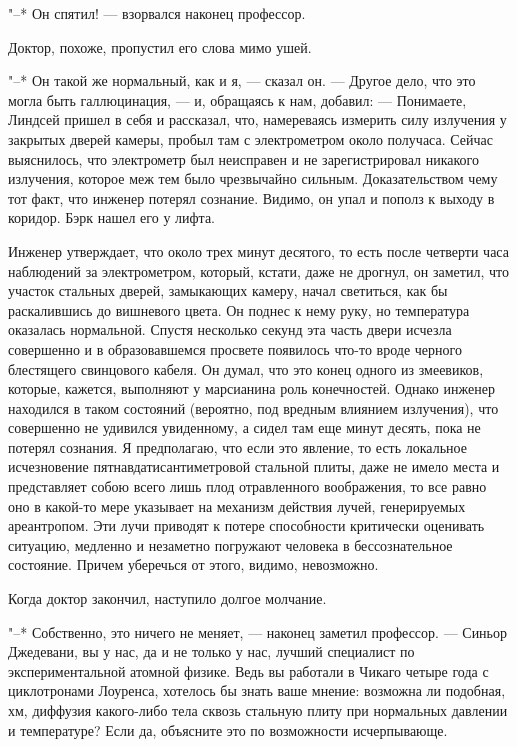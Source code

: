 "--* Он спятил! --- взорвался наконец профессор.

Доктор, похоже, пропустил его слова мимо ушей.

"--* Он такой же нормальный, как и я, --- сказал он. --- Другое дело, что  это
могла быть галлюцинация, --- и,  обращаясь  к  нам,  добавил:  ---  Понимаете,
Линдсей  пришел  в  себя  и  рассказал,  что,  намереваясь  измерить  силу
излучения у закрытых дверей  камеры,  пробыл  там  с  электрометром  около
получаса.  Сейчас  выяснилось,  что  электрометр  был  неисправен   и   не
зарегистрировал никакого  излучения,  которое  меж  тем  было  чрезвычайно
сильным. Доказательством чему тот  факт,  что  инженер  потерял  сознание.
Видимо, он упал и пополз к выходу в коридор. Бэрк нашел его у лифта.

Инженер утверждает, что  около  трех  минут  десятого,  то  есть  после
четверти часа  наблюдений  за  электрометром,  который,  кстати,  даже  не
дрогнул, он заметил, что участок стальных дверей, замыкающих камеру, начал
светиться, как бы раскалившись до вишневого цвета. Он поднес к нему  руку,
но температура оказалась нормальной. Спустя  несколько  секунд  эта  часть
двери исчезла совершенно и  в  образовавшемся  просвете  появилось  что-то
вроде черного блестящего свинцового кабеля. Он думал, что это конец одного
из змеевиков, которые, кажется, выполняют у марсианина  роль  конечностей.
Однако инженер находился в таком состояний (вероятно, под вредным влиянием
излучения), что совершенно не удивился увиденному, а сидел там  еще  минут
десять, пока не потерял сознания. Я предполагаю, что если это явление,  то
есть локальное исчезновение пятнавдатисантиметровой стальной  плиты,  даже
не  имело  места  и  представляет  собою  всего  лишь  плод   отравленного
воображения, то все равно  оно  в  какой-то  мере  указывает  на  механизм
действия лучей, генерируемых  ареантропом.  Эти  лучи  приводят  к  потере
способности критически оценивать ситуацию, медленно и незаметно  погружают
человека в бессознательное состояние. Причем уберечься от  этого,  видимо,
невозможно.

Когда доктор закончил, наступило долгое молчание.

"--* Собственно, это ничего не меняет,  ---  наконец  заметил  профессор.  ---
Синьор Джедевани, вы у нас, да и не только у  нас,  лучший  специалист  по
экспериментальной атомной физике. Ведь вы работали в Чикаго четыре года  с
циклотронами  Лоуренса,  хотелось  бы  знать  ваше  мнение:  возможна   ли
подобная,  хм,  диффузия  какого-либо  тела  сквозь  стальную  плиту   при
нормальных давлении и температуре? Если да, объясните это  по  возможности
исчерпывающе.

